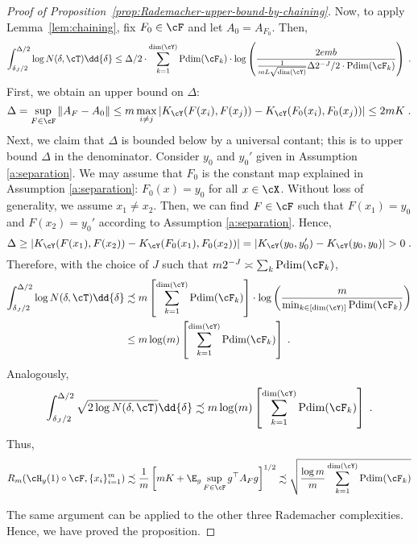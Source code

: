 \documentclass[11pt]{article}
\begin{document}
\begin{proof}[Proof of Proposition~\ref{prop:Rademacher-upper-bound-by-chaining}]
	Now, to apply Lemma~\ref{lem:chaining}, fix $F_0 \in \cF$ and let $A_0 = A_{F_0}$. Then, 
	\begin{equation*}
		\int_{\delta_J / 2}^{\Delta/2} \log N(\delta, \cT) \dd{\delta} 
		\leq \Delta / 2 \cdot \sum_{k=1}^{{\rm dim}(\cY)} {\rm Pdim}(\cF_{k}) \cdot \log \left( \frac{2 e m b}{ \tfrac{1}{m L \sqrt{\mathrm{dim}(\cY)}} \Delta 2^{-J} / 2 \cdot {\rm Pdim}(\cF_{k})} \right) \;.
	\end{equation*}
	First, we obtain an upper bound on $\Delta$:
	\begin{equation*}
		\Delta = \sup_{F \in \cF} \|A_F - A_0\| \le m \max_{i\neq j} \left|K_{\cY}(F(x_i), F(x_j)) - K_{\cY}(F_0(x_i), F_0(x_j))\right| \le 2 m K \;.
	\end{equation*}
	Next, we claim that $\Delta$ is bounded below by a universal contant; this is to upper bound $\Delta$ in the denominator. Consider $y_0$ and $y_0'$ given in Assumption \ref{a:separation}. We may assume that $F_0$ is the constant map explained in Assumption \ref{a:separation}: $F_0(x) = y_0$ for all $x \in \cX$. Without loss of generality, we assume $x_1 \neq x_2$. Then, we can find $F \in \cF$ such that $F(x_1) = y_0$ and $F(x_2) = y_0'$ according to Assumption \ref{a:separation}. Hence, 
	\begin{equation*}
		\Delta \ge |K_{\cY}(F(x_1), F(x_2)) - K_{\cY}(F_0(x_1), F_0(x_2))| = |K_{\cY}(y_0, y_0') - K_{\cY}(y_0, y_0)| > 0 \;. 
	\end{equation*}
	Therefore, with the choice of $J$ such that $m 2^{-J} \asymp \sum_k {\rm Pdim}(\cF_{k})$, 
	\begin{equation*}
		\begin{split}
			\int_{\delta_J / 2}^{\Delta/2} \log N(\delta, \cT) \dd{\delta} 
			& \precsim m \left[\sum_{k=1}^{{\rm dim}(\cY)} {\rm Pdim}(\cF_{k}) \right] \cdot \log \left(\frac{m}{\min_{k \in [\mathrm{dim}(\cY)]} {\rm Pdim}(\cF_{k}) } \right) \\
			& \le m \log(m) \left[\sum_{k=1}^{{\rm dim}(\cY)} {\rm Pdim}(\cF_{k}) \right] \;.
		\end{split} 
	\end{equation*}
	Analogously, 
	\begin{equation*}
		\int_{\delta_J / 2}^{\Delta/2} \sqrt{2 \log N(\delta, \cT)} \dd{\delta} 
		\precsim m \log(m) \left[\sum_{k=1}^{{\rm dim}(\cY)} {\rm Pdim}(\cF_{k}) \right] \;.
	\end{equation*}
	Thus,
	\begin{align*}
		R_m(\cH_y(1)\circ \cF, \{x_i\}_{i=1}^{m}) \precsim \frac{1}{m} \left[ m K + \E_{g} \sup_{F \in \cF}  g^\top A_F g \right]^{1/2}
		\precsim \sqrt{\frac{\log m}{m} \sum_{k =1}^{{\rm dim}(\cY)} {\rm Pdim}(\cF_{k}) }
	\end{align*}
	
	The same argument can be applied to the other three Rademacher complexities. Hence, we have proved the proposition.
\end{proof}
\end{document}
